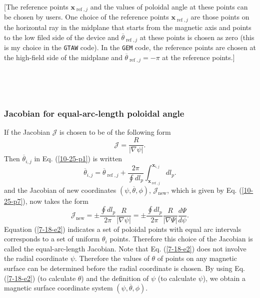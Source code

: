 \documentclass{article}
\newcommand{\code}[1]{\texttt{#1}}
\newcommand{\tmop}[1]{\ensuremath{\operatorname{#1}}}
\begin{document}
[The reference points $\mathbf{x}_{\tmop{ref}, j}$ and the values of poloidal
angle at these points can be chosen by users. One choice of the reference
points $\mathbf{x}_{\tmop{ref}, j}$ are those points on the horizontal ray in
the midplane that starts from the magnetic axis and points to the low filed
side of the device and $\overline{\theta}_{\tmop{ref}, j}$ at these points is
chosen as zero (this is my choice in the {\code{GTAW}} code). In the
{\code{GEM}} code, the reference points are chosen at the high-field side of
the midplane and $\overline{\theta}_{\tmop{ref}, j} = - \pi$ at the reference
points.]

\

\

\subsubsection{Jacobian for equal-arc-length poloidal angle}

If the Jacobian $\mathcal{J}$ is chosen to be of the following form
\begin{equation}
  \label{7-18-e1} \mathcal{J}= \frac{R}{| \nabla \psi |} .
\end{equation}
Then $\overline{\theta}_{i, j}$ in Eq. (\ref{10-25-p1}) is written
\begin{equation}
  \label{7-18-e2} \overline{\theta}_{i, j} = \overline{\theta}_{\tmop{ref}, j}
  + \frac{2 \pi}{\oint d l_p} \int_{\mathbf{x}_{\tmop{ref},
  j}}^{\mathbf{x}_{i, j}} d l_p .
\end{equation}
and the Jacobian of new coordinates $(\psi, \overline{\theta}, \phi)$,
$\mathcal{J}_{\tmop{new}}$, which is given by Eq. (\ref{10-25-p7}), now takes
the form
\begin{equation}
  \label{5-14-p1} \mathcal{J}_{\tmop{new}} = \pm \frac{\oint d l_p}{2 \pi} 
  \frac{R}{| \nabla \psi |} = \pm \frac{\oint d l_p}{2 \pi}  \frac{R}{| \nabla
  \Psi |}  \frac{d \Psi}{d \psi} .
\end{equation}
Equation (\ref{7-18-e2}) indicates a set of poloidal points with equal arc
intervals corresponds to a set of uniform $\theta_i$ points. Therefore this
choice of the Jacobian is called the equal-arc-length Jacobian. Note that Eq.
(\ref{7-18-e2}) does not involve the radial coordinate $\psi$. Therefore the
values of $\theta$ of points on any magnetic surface can be determined before
the radial coordinate is chosen. By using Eq. (\ref{7-18-e2}) (to calculate
$\theta$) and the definition of $\psi$ (to calculate $\psi$), we obtain a
magnetic surface coordinate system $(\psi, \overline{\theta}, \phi)$.
\end{document}
